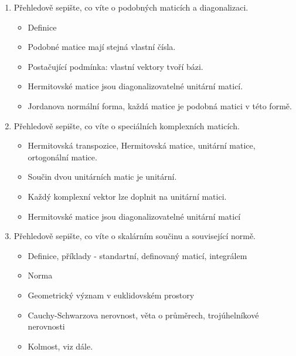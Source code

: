 \documentclass[10pt,a4paper]{article}
\theoremstyle{plain}
\begin{document}
\begin{enumerate}
\item Přehledově sepište, co víte o podobných maticích a diagonalizaci.
\begin{itemize}
\item Definice
\item Podobné matice mají stejná vlastní čísla.
\item Postačující podmínka: vlastní vektory tvoří bázi.
\item Hermitovské matice jsou diagonalizovatelné unitární maticí.
\item Jordanova normální forma, každá matice je podobná matici v této formě.
\end{itemize}


\item Přehledově sepište, co víte o speciálních komplexních maticích.
\begin{itemize}
\item Hermitovská transpozice, Hermitovská matice, unitární matice, ortogonální matice.
\item Součin dvou unitárních matic je unitární.
\item Každý komplexní vektor lze doplnit na unitární matici.
\item Hermitovské matice jsou diagonalizovatelné unitární maticí
\end{itemize}


\item Přehledově sepište, co víte o skalárním součinu a související normě.
\begin{itemize}
\item Definice, příklady - standartní, definovaný maticí, integrálem
\item Norma
\item Geometrický význam v euklidovském prostory
\item Cauchy-Schwarzova nerovnost, věta o průměrech, trojúhelníkové nerovnosti
\item Kolmost, viz dále. 
\end{itemize}



\end{enumerate}
\end{document}
